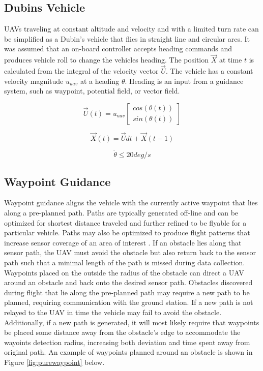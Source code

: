 \documentclass[conf]{new-aiaa}
\begin{document}
\subsection{Dubins Vehicle}
UAVs traveling at constant altitude and velocity and with a limited turn rate can be simplified as a Dubin's vehicle that flies in straight line and circular arcs. It was assumed that an on-board controller accepts heading commands and produces vehicle roll to change the vehicles heading. The position $\overrightarrow{X}$ at time $t$ is calculated from the integral of the velocity vector $\overrightarrow{U}$. The vehicle has a constant velocity magnitude $u_{uav}$ at a heading $\theta$. Heading is an input from a guidance system, such as waypoint, potential field, or vector field.

\begin{equation}
\label{uavVelocity}
\overrightarrow{U}(t) = u_{uav} \begin{bmatrix}
cos(\theta(t)) \\
sin(\theta(t))
\end{bmatrix}
\end{equation}


\begin{equation}
\label{uavPosition}
\overrightarrow{X}(t) = \overrightarrow{U}dt + \overrightarrow{X}(t-1)
\end{equation}


\begin{equation}
\label{turnRate}
\dot{\theta} \leq 20 deg/s
\end{equation}



\subsection{Waypoint Guidance}
Waypoint guidance aligns the vehicle with the currently active waypoint that lies along a pre-planned path. Paths are typically generated off-line and can be optimized for shortest distance traveled and further refined to be flyable for a particular vehicle. Paths may also be optimized to produce flight patterns that increase sensor coverage of an area of interest \cite{wilhelm_direct_2017}. If an obstacle lies along that sensor path, the UAV must avoid the obstacle but also return back to the sensor path such that a minimal length of the path is missed during data collection. Waypoints placed on the outside the radius of the obstacle can direct a UAV around an obstacle and back onto the desired sensor path. Obstacles discovered during flight that lie along the pre-planned path may require a new path to be planned, requiring communication with the ground station. If a new path is not relayed to the UAV in time the vehicle may fail to avoid the obstacle. Additionally, if a new path is generated, it will most likely require that waypoints be placed some distance away from the obstacle's edge to accommodate the wayoints detection radius, increasing both deviation and time spent away from original path. An example of waypoints planned around an obstacle is shown in Figure \ref{fig:purewaypoint} below. 
\end{document}
